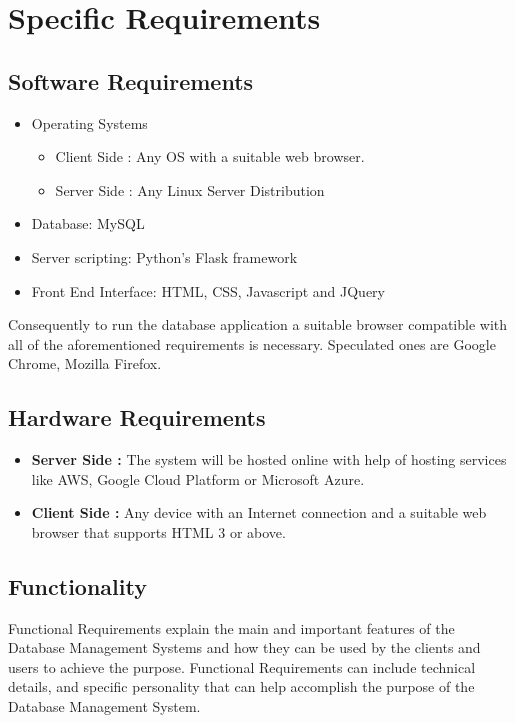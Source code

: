 \documentclass[12pt]{report}
\begin{document}
\section{Specific Requirements} 

\subsection{Software Requirements}

\begin{itemize}
\item Operating Systems
\begin{itemize}
\item Client Side : Any OS with a suitable web browser. 
\item Server Side : Any Linux Server Distribution

\end{itemize}

\item Database: MySQL 
\item  Server scripting: Python’s Flask framework
\item Front End Interface: HTML, CSS, Javascript and JQuery
\end{itemize}

Consequently to run the database application a suitable browser compatible with all of the aforementioned requirements is necessary. Speculated ones are Google Chrome, Mozilla Firefox.




\subsection{Hardware Requirements}
\begin{itemize}
\item \textbf{Server Side :} The system will be hosted online with help of hosting services like AWS, Google Cloud Platform or Microsoft Azure. 

\item\textbf{Client Side :}   Any device with an Internet connection and a suitable web browser that supports HTML 3 or above. 
\end{itemize}



\subsection{Functionality}
Functional Requirements explain the main and important features of the Database Management Systems and how they can be used by the clients and users to achieve the purpose. Functional Requirements can include technical details, and specific personality that can help accomplish the purpose of the Database Management System.
\end{document}
